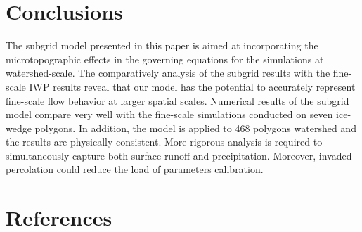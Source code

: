 \documentclass[review,11pt]{elsarticle}
\begin{document}

\section{Conclusions}\label{conclusion}
The subgrid model presented in this paper is aimed at incorporating the microtopographic effects in the governing equations for the simulations at watershed-scale. The comparatively analysis of the subgrid results with the fine-scale IWP results reveal that our model has the potential to accurately represent fine-scale flow behavior at larger spatial scales. Numerical results of the subgrid model compare very well with the fine-scale simulations conducted on seven ice-wedge polygons. In addition, the model is applied to 468 polygons watershed and the results are physically consistent. More rigorous analysis is required to simultaneously capture both surface runoff and precipitation. Moreover, invaded percolation could reduce the load of parameters calibration.
\section*{References}


\end{document}
